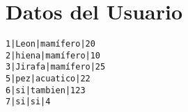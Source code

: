 \documentclass{article}
\begin{document}
\section*{Datos del Usuario}
\begin{verbatim}
1|Leon|mamífero|20
2|hiena|mamífero|10
3|Jirafa|mamífero|25
5|pez|acuatico|22
6|si|tambien|123
7|si|si|4
\end{verbatim}
\end{document}
